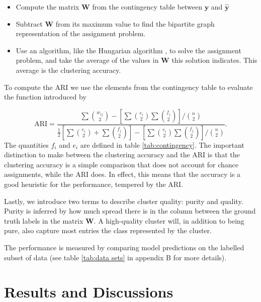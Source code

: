 \documentclass[review,sort&compress]{elsarticle}
\begin{document}
\begin{itemize}
    \item Compute the matrix $\mathbf{W}$ from the contingency table between $\mathbf{y}$ and $\mathbf{\hat{y}}$
    \item Subtract $\mathbf{W}$ from its maximum value to find the bipartite graph representation of the assignment problem.
    \item Use an algorithm, like the Hungarian algorithm \cite{burkard2012}, to solve the assignment problem, and take the average of the values in $\mathbf{W}$ this solution indicates. This average is the clustering accuracy. 
\end{itemize}

To compute the ARI we use the elements from the contingency table to evaluate the function introduced by \citet{Hubert1985}

\begin{equation}\label{eq:ari}
\text{ARI} = \frac{\sum  \binom{w_{ij}}{2} - \left[\sum  \binom{e_{i}}{2} \sum  \binom{f_{j}}{2}  \right]/\binom{n}{2}}{\frac{1}{2}\left[\sum  \binom{e_{i}}{2} + \sum  \binom{f_{j}}{2}  \right]- \left[\sum  \binom{e_{i}}{2} \sum  \binom{f_{j}}{2}  \right]/\binom{n}{2}}.
\end{equation}
The quantities $f_i$ and $e_i$ are defined in table \ref{tab:contingency}.
The important distinction to make between the clustering accuracy and the ARI is that the clustering accuracy is a simple comparison that does not account for chance assignments, while the ARI does. In effect, this means that the accuracy is a good heuristic for the performance, tempered by the ARI. 

Lastly, we introduce two terms to describe cluster quality: purity and quality. Purity is inferred by how much spread there is in the column between the ground truth labels in the matrix $\mathbf{W}$. A high-quality cluster will, in addition to being pure, also capture most entries the class represented by the cluster.

The performance is measured by comparing model predictions on the labelled subset of data (see table \ref{tab:data sets} in  appendix B for more details).


\section{Results and Discussions}\label{sec:results}
\end{document}
